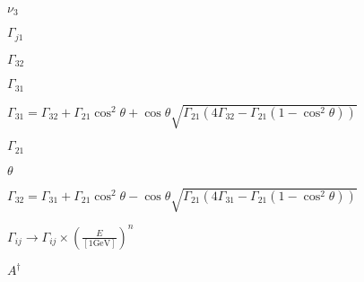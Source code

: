 \documentclass{article}
\begin{document}
$\nu_3$
\pagebreak

$\Gamma_{j1}$
\pagebreak

$\Gamma_{32}$
\pagebreak

$\Gamma_{31}$
\pagebreak

$
  \Gamma_{31} = \Gamma_{32} + \Gamma_{21} \cos^2\theta +
  \cos\theta \sqrt{\Gamma_{21} (4\Gamma_{32} - \Gamma_{21} (1 - \cos^2\theta))}
  $
\pagebreak

$\Gamma_{21}$
\pagebreak

$\theta$
\pagebreak

$ 
  \Gamma_{32} = \Gamma_{31} + \Gamma_{21} \cos^2\theta - 
  \cos\theta \sqrt{\Gamma_{21} (4\Gamma_{31} - \Gamma_{21} (1 - \cos^2\theta))} 
  $
\pagebreak

$ 
  \Gamma_{ij} \rightarrow \Gamma_{ij} \times \left(\frac{E}{[1 \mbox{GeV}]}\right)^n
  $
\pagebreak

$A^{\dagger}$
\pagebreak
\end{document}
